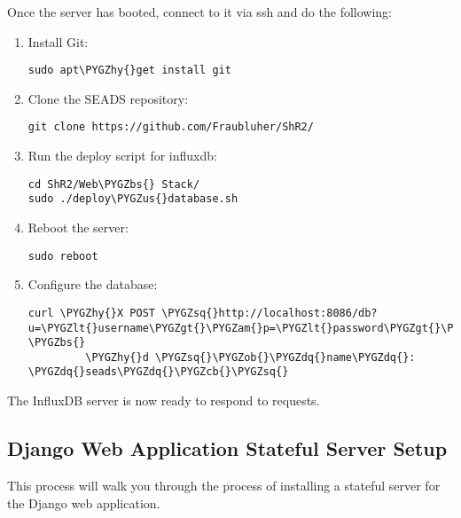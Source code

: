 \documentclass[letterpaper,10pt,english]{sphinxmanual}
\def\PYGZbs{\char`\\}
\def\PYGZus{\char`\_}
\def\PYGZob{\char`\{}
\def\PYGZcb{\char`\}}
\def\PYGZam{\char`\&}
\def\PYGZlt{\char`\<}
\def\PYGZgt{\char`\>}
\def\PYGZhy{\char`\-}
\def\PYGZsq{\char`\'}
\def\PYGZdq{\char`\"}
\renewcommand\PYGZsq{\textquotesingle}
\begin{document}
Once the server has booted, connect to it via ssh and do the following:
\begin{enumerate}
\item {} 
Install Git:

\begin{Verbatim}[commandchars=\\\{\}]
sudo apt\PYGZhy{}get install git
\end{Verbatim}

\item {} 
Clone the SEADS repository:

\begin{Verbatim}[commandchars=\\\{\}]
git clone https://github.com/Fraubluher/ShR2/
\end{Verbatim}

\item {} 
Run the deploy script for influxdb:

\begin{Verbatim}[commandchars=\\\{\}]
cd ShR2/Web\PYGZbs{} Stack/
sudo ./deploy\PYGZus{}database.sh
\end{Verbatim}

\item {} 
Reboot the server:

\begin{Verbatim}[commandchars=\\\{\}]
sudo reboot
\end{Verbatim}

\item {} 
Configure the database:

\begin{Verbatim}[commandchars=\\\{\}]
curl \PYGZhy{}X POST \PYGZsq{}http://localhost:8086/db?u=\PYGZlt{}username\PYGZgt{}\PYGZam{}p=\PYGZlt{}password\PYGZgt{}\PYGZsq{} \PYGZbs{}
         \PYGZhy{}d \PYGZsq{}\PYGZob{}\PYGZdq{}name\PYGZdq{}: \PYGZdq{}seads\PYGZdq{}\PYGZcb{}\PYGZsq{}
\end{Verbatim}

\end{enumerate}

The InfluxDB server is now ready to respond to requests.


\subsection{Django Web Application Stateful Server Setup}
\label{installation:django-web-application-stateful-server-setup}
This process will walk you through the process of installing a stateful server for the Django web application.
\end{document}
